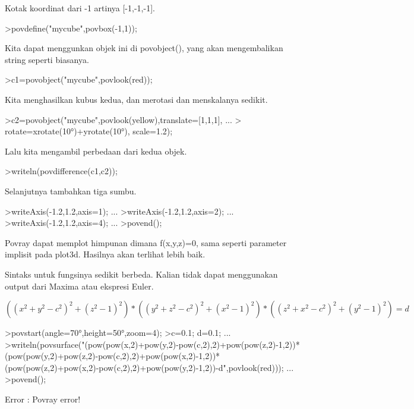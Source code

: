 \documentclass{article}
\begin{document}
\begin{eulernotebook}
\begin{eulercomment}
Kotak koordinat dari -1 artinya [-1,-1,-1].
\end{eulercomment}
\begin{eulerprompt}
>povdefine("mycube",povbox(-1,1));
\end{eulerprompt}
\begin{eulercomment}
Kita dapat menggunkan objek ini di povobject(), yang akan
mengembalikan string seperti biasanya.
\end{eulercomment}
\begin{eulerprompt}
>c1=povobject("mycube",povlook(red));
\end{eulerprompt}
\begin{eulercomment}
Kita menghasilkan kubus kedua, dan merotasi dan menskalanya sedikit.
\end{eulercomment}
\begin{eulerprompt}
>c2=povobject("mycube",povlook(yellow),translate=[1,1,1], ...
>  rotate=xrotate(10°)+yrotate(10°), scale=1.2);
\end{eulerprompt}
\begin{eulercomment}
Lalu kita mengambil perbedaan dari kedua objek.
\end{eulercomment}
\begin{eulerprompt}
>writeln(povdifference(c1,c2));
\end{eulerprompt}
\begin{eulercomment}
Selanjutnya tambahkan tiga sumbu.
\end{eulercomment}
\begin{eulerprompt}
>writeAxis(-1.2,1.2,axis=1); ...
>writeAxis(-1.2,1.2,axis=2); ...
>writeAxis(-1.2,1.2,axis=4); ...
>povend();
\end{eulerprompt}
\begin{eulercomment}
Povray dapat memplot himpunan dimana f(x,y,z)=0, sama seperti
parameter implisit pada plot3d. Hasilnya akan terlihat lebih baik.

Sintaks untuk fungsinya sedikit berbeda. Kalian tidak dapat
menggunakan output dari Maxima atau ekspresi Euler.

\end{eulercomment}
\begin{eulerformula}
\[
((x^2+y^2-c^2)^2+(z^2-1)^2)*((y^2+z^2-c^2)^2+(x^2-1)^2)*((z^2+x^2-c^2)^2+(y^2-1)^2)=d
\]
\end{eulerformula}
\begin{eulerprompt}
>povstart(angle=70°,height=50°,zoom=4);
>c=0.1; d=0.1; ...
>writeln(povsurface("(pow(pow(x,2)+pow(y,2)-pow(c,2),2)+pow(pow(z,2)-1,2))*(pow(pow(y,2)+pow(z,2)-pow(c,2),2)+pow(pow(x,2)-1,2))*(pow(pow(z,2)+pow(x,2)-pow(c,2),2)+pow(pow(y,2)-1,2))-d",povlook(red))); ...
>povend();
\end{eulerprompt}
\begin{euleroutput}
  Error : Povray error!
  

\end{euleroutput}
\end{eulernotebook}
\end{document}

